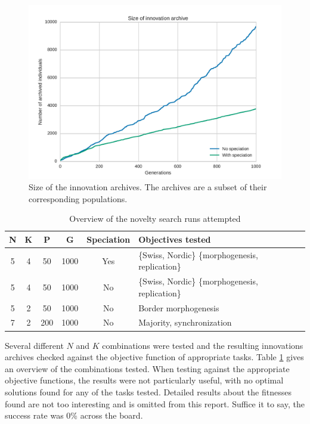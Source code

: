 \begin{figure}
\centering
\includegraphics[height=0.4\textheight, width=\textwidth, keepaspectratio]{fig/innovation_archive_size}
\caption[
    Size of the innovation archives
]{
    Size of the innovation archives.
    The archives are a subset of their corresponding populations.
}
\label{fig:innovation_archive_size}
\end{figure}

\begin{table}
\centering
\caption{Overview of the novelty search runs attempted}
\begin{tabular}{c|c|c|c|c|l}
    N   &   K   &   P   &   G   &   Speciation  &   Objectives tested   \\\hline
    5   &   4   &   50  &   1000    &   Yes &   \{Swiss, Nordic\} \{morphogenesis, replication\} \\
    5   &   4   &   50  &   1000    &   No  &   \{Swiss, Nordic\} \{morphogenesis, replication\} \\
    5   &   2   &   50  &   1000    &   No  &   Border morphogenesis \\
    7   &   2   &   200 &   1000    &   No  &   Majority, synchronization
\end{tabular}
\label{tbl:novelty}
\end{table}

Several different $N$ and $K$ combinations were tested and the resulting innovations archives checked against the objective function of appropriate tasks.
Table \ref{tbl:novelty} gives an overview of the combinations tested.
When testing against the appropriate objective functions, the results were not particularly useful, with no optimal solutions found for any of the tasks tested.
Detailed results about the fitnesses found are not too interesting and is omitted from this report.
Suffice it to say, the success rate was 0\% across the board.

